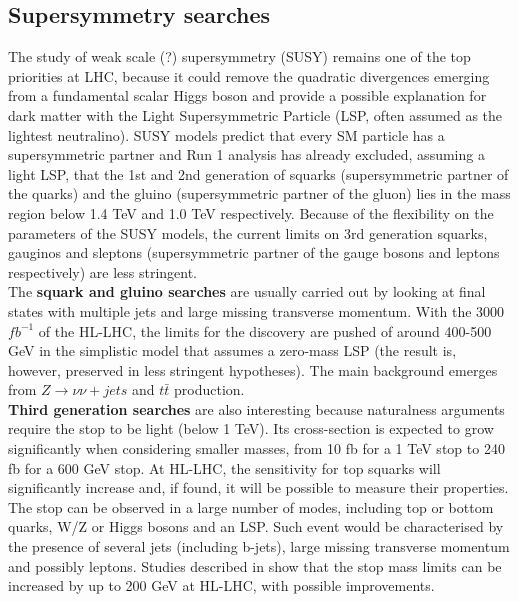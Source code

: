 \documentclass[a4paper,twoside,12pt]{article}
\begin{document}
\subsection{Supersymmetry searches}
The study of weak scale (?) supersymmetry (SUSY) remains one of the top priorities at LHC, because
it could remove the quadratic divergences emerging from a fundamental scalar Higgs boson and provide a possible explanation for dark matter with the Light Supersymmetric Particle (LSP, often assumed as the lightest neutralino).
SUSY models predict that every SM particle has a supersymmetric partner and Run 1 analysis
has already excluded, assuming a light LSP, that the 1st and 2nd generation of squarks (supersymmetric partner of the quarks) and the gluino (supersymmetric partner of the gluon) lies in the mass region below 1.4 TeV and 1.0
TeV respectively. Because of the flexibility on the parameters of the SUSY models, 
the current limits on 3rd generation squarks, gauginos and sleptons (supersymmetric partner
of the gauge bosons and leptons respectively) are less stringent.\\

The \textbf{squark and gluino searches} are usually carried out by looking at final states
with multiple jets and large missing transverse momentum. With the 3000 $fb^{-1}$ of the 
HL-LHC, the limits for the discovery are pushed of around 400-500 GeV\cite{loi} in the 
simplistic model that assumes a zero-mass LSP (the result is, however, preserved in less
stringent hypotheses). The main background emerges from $Z \rightarrow \nu\nu + jets$ and 
$t\bar{t}$ production.\\

\textbf{Third generation searches} are also interesting because naturalness arguments require
the stop to be light (below 1 TeV). Its cross-section is expected to grow significantly when 
considering smaller masses, from 10 fb for a 1 TeV stop to 240 fb for a 600 GeV stop. At
HL-LHC, the sensitivity for top squarks will significantly increase and, if found, it will be possible to measure their properties. The stop can be observed in a large number of modes,
including top or bottom
quarks, W/Z or Higgs bosons and an LSP. Such event would be characterised by the presence
of several jets (including b-jets), large missing transverse momentum and possibly leptons. 
Studies described in \cite{loi} show that the stop mass limits can be increased by up to
200 GeV at HL-LHC, with possible improvements.\\
\end{document}
